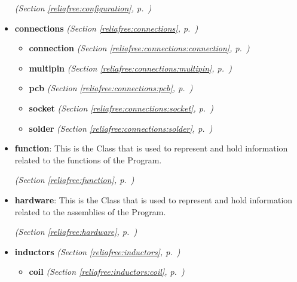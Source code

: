 \begin{itemize}
  \textit{(Section \ref{reliafree:configuration}, p.~\pageref{reliafree:configuration})}

\item \textbf{connections}
  \textit{(Section \ref{reliafree:connections}, p.~\pageref{reliafree:connections})}

  \begin{itemize}
\setlength{\parskip}{0ex}
    \item \textbf{connection}
  \textit{(Section \ref{reliafree:connections:connection}, p.~\pageref{reliafree:connections:connection})}

    \item \textbf{multipin}
  \textit{(Section \ref{reliafree:connections:multipin}, p.~\pageref{reliafree:connections:multipin})}

    \item \textbf{pcb}
  \textit{(Section \ref{reliafree:connections:pcb}, p.~\pageref{reliafree:connections:pcb})}

    \item \textbf{socket}
  \textit{(Section \ref{reliafree:connections:socket}, p.~\pageref{reliafree:connections:socket})}

    \item \textbf{solder}
  \textit{(Section \ref{reliafree:connections:solder}, p.~\pageref{reliafree:connections:solder})}

  \end{itemize}
\item \textbf{function}: This is the Class that is used to represent and hold information related to
the functions of the Program.



  \textit{(Section \ref{reliafree:function}, p.~\pageref{reliafree:function})}

\item \textbf{hardware}: This is the Class that is used to represent and hold information related to
the assemblies of the Program.



  \textit{(Section \ref{reliafree:hardware}, p.~\pageref{reliafree:hardware})}

\item \textbf{inductors}
  \textit{(Section \ref{reliafree:inductors}, p.~\pageref{reliafree:inductors})}

  \begin{itemize}
\setlength{\parskip}{0ex}
    \item \textbf{coil}
  \textit{(Section \ref{reliafree:inductors:coil}, p.~\pageref{reliafree:inductors:coil})}


\end{itemize}
\end{itemize}
